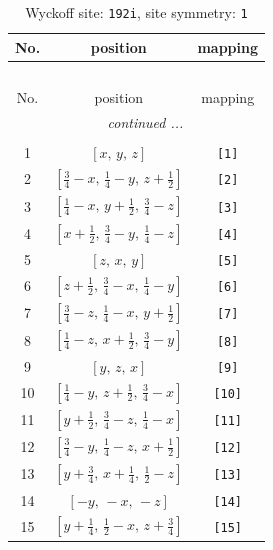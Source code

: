 \documentclass[fleqn,8pt]{jsarticle}
\begin{document}
\begin{longtable}{ccc}
\caption{Wyckoff site: {\tt 192i}, site symmetry: {\tt 1}}
 \\
 \hline \hline
No. & position & mapping \\ \hline \endfirsthead

\multicolumn{2}{l}{\tablename\ \thetable{}} \\
 \hline \hline
No. & position & mapping \\ \hline \endhead

 \hline \hline
\multicolumn{2}{r}{\footnotesize\it continued ...} \\ \endfoot

 \hline \hline
\multicolumn{2}{r}{} \\ \endlastfoot

1 & $\left[ x,\, y,\, z \right]$ & {\tt [1]} \\ \hline
2 & $\left[ \frac{3}{4} - x,\, \frac{1}{4} - y,\, z + \frac{1}{2} \right]$ & {\tt [2]} \\ \hline
3 & $\left[ \frac{1}{4} - x,\, y + \frac{1}{2},\, \frac{3}{4} - z \right]$ & {\tt [3]} \\ \hline
4 & $\left[ x + \frac{1}{2},\, \frac{3}{4} - y,\, \frac{1}{4} - z \right]$ & {\tt [4]} \\ \hline
5 & $\left[ z,\, x,\, y \right]$ & {\tt [5]} \\ \hline
6 & $\left[ z + \frac{1}{2},\, \frac{3}{4} - x,\, \frac{1}{4} - y \right]$ & {\tt [6]} \\ \hline
7 & $\left[ \frac{3}{4} - z,\, \frac{1}{4} - x,\, y + \frac{1}{2} \right]$ & {\tt [7]} \\ \hline
8 & $\left[ \frac{1}{4} - z,\, x + \frac{1}{2},\, \frac{3}{4} - y \right]$ & {\tt [8]} \\ \hline
9 & $\left[ y,\, z,\, x \right]$ & {\tt [9]} \\ \hline
10 & $\left[ \frac{1}{4} - y,\, z + \frac{1}{2},\, \frac{3}{4} - x \right]$ & {\tt [10]} \\ \hline
11 & $\left[ y + \frac{1}{2},\, \frac{3}{4} - z,\, \frac{1}{4} - x \right]$ & {\tt [11]} \\ \hline
12 & $\left[ \frac{3}{4} - y,\, \frac{1}{4} - z,\, x + \frac{1}{2} \right]$ & {\tt [12]} \\ \hline
13 & $\left[ y + \frac{3}{4},\, x + \frac{1}{4},\, \frac{1}{2} - z \right]$ & {\tt [13]} \\ \hline
14 & $\left[ - y,\, - x,\, - z \right]$ & {\tt [14]} \\ \hline
15 & $\left[ y + \frac{1}{4},\, \frac{1}{2} - x,\, z + \frac{3}{4} \right]$ & {\tt [15]} \\ \hline

\end{longtable}
\end{document}

